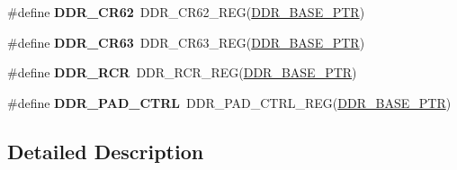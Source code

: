 \begin{DoxyCompactItemize}
\item 
\hypertarget{group___d_d_r___register___accessor___macros_gae38e044d7e8d1ba4603016c4899aa114}{}\#define {\bfseries D\+D\+R\+\_\+\+C\+R62}~D\+D\+R\+\_\+\+C\+R62\+\_\+\+R\+E\+G(\hyperlink{group___d_d_r___peripheral_ga6be9f9ecee4c870709dbf1d87708b205}{D\+D\+R\+\_\+\+B\+A\+S\+E\+\_\+\+P\+T\+R})\label{group___d_d_r___register___accessor___macros_gae38e044d7e8d1ba4603016c4899aa114}

\item 
\hypertarget{group___d_d_r___register___accessor___macros_gacc5d58568f417fdf46734b3b94b559a6}{}\#define {\bfseries D\+D\+R\+\_\+\+C\+R63}~D\+D\+R\+\_\+\+C\+R63\+\_\+\+R\+E\+G(\hyperlink{group___d_d_r___peripheral_ga6be9f9ecee4c870709dbf1d87708b205}{D\+D\+R\+\_\+\+B\+A\+S\+E\+\_\+\+P\+T\+R})\label{group___d_d_r___register___accessor___macros_gacc5d58568f417fdf46734b3b94b559a6}

\item 
\hypertarget{group___d_d_r___register___accessor___macros_ga6cbf748b01f861b7469a5de31c372731}{}\#define {\bfseries D\+D\+R\+\_\+\+R\+C\+R}~D\+D\+R\+\_\+\+R\+C\+R\+\_\+\+R\+E\+G(\hyperlink{group___d_d_r___peripheral_ga6be9f9ecee4c870709dbf1d87708b205}{D\+D\+R\+\_\+\+B\+A\+S\+E\+\_\+\+P\+T\+R})\label{group___d_d_r___register___accessor___macros_ga6cbf748b01f861b7469a5de31c372731}

\item 
\hypertarget{group___d_d_r___register___accessor___macros_ga93cf19fdfb099a598753a2b2b643bc57}{}\#define {\bfseries D\+D\+R\+\_\+\+P\+A\+D\+\_\+\+C\+T\+R\+L}~D\+D\+R\+\_\+\+P\+A\+D\+\_\+\+C\+T\+R\+L\+\_\+\+R\+E\+G(\hyperlink{group___d_d_r___peripheral_ga6be9f9ecee4c870709dbf1d87708b205}{D\+D\+R\+\_\+\+B\+A\+S\+E\+\_\+\+P\+T\+R})\label{group___d_d_r___register___accessor___macros_ga93cf19fdfb099a598753a2b2b643bc57}

\end{DoxyCompactItemize}


\subsection{Detailed Description}
